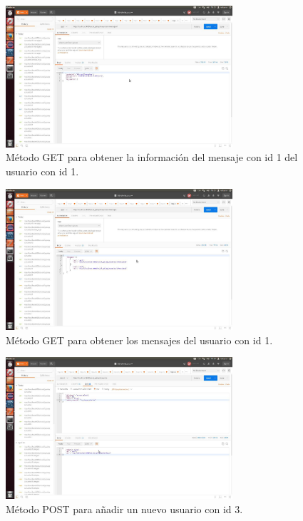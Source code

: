 \documentclass[12pt,a4paper, spanish]{article}
\begin{document}
\begin{figure}[H]
	\centering
	\includegraphics[width=0.75\textwidth]{images/captura7.jpg}
	\caption{Método GET para obtener la información del mensaje con id 1 del usuario con id 1.}
\end{figure}

\begin{figure}[H]
	\centering
	\includegraphics[width=0.75\textwidth]{images/captura8.jpg}
	\caption{Método GET para obtener los mensajes del usuario con id 1.}
\end{figure}

\begin{figure}[H]
	\centering
	\includegraphics[width=0.75\textwidth]{images/captura9.jpg}
	\caption{Método POST para añadir un nuevo usuario con id 3.}
\end{figure}
\end{document}
